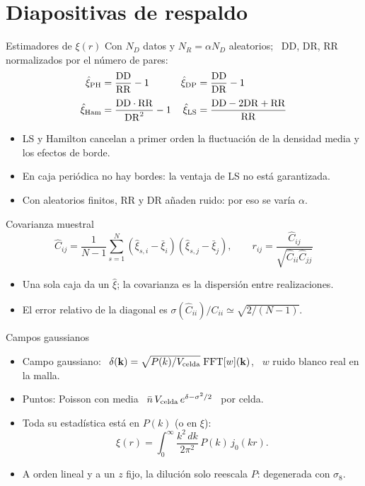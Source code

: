 \documentclass[aspectratio=169]{beamer}
\newcommand{\DD}{\mathrm{DD}}
\newcommand{\DR}{\mathrm{DR}}
\newcommand{\RR}{\mathrm{RR}}
\begin{document}
\appendix
\section{Diapositivas de respaldo}

\begin{frame}{Estimadores de $\xi(r)$}
  Con $N_D$ datos y $N_R=\alpha N_D$ aleatorios; \ DD, DR, RR normalizados por el número de pares:
  \begin{align*}
    \hat\xi_{\rm PH}  &= \frac{\DD}{\RR}-1 &
    \hat\xi_{\rm DP}  &= \frac{\DD}{\DR}-1\\[0.3em]
    \hat\xi_{\rm Ham} &= \frac{\DD\cdot\RR}{\DR^2}-1 &
    \hat\xi_{\rm LS}  &= \frac{\DD-2\DR+\RR}{\RR}
  \end{align*}
  \begin{itemize}
    \item LS y Hamilton cancelan a primer orden la fluctuación de la densidad media y los efectos de borde.
    \item En caja periódica no hay bordes: la ventaja de LS no está garantizada.
    \item Con aleatorios finitos, $\RR$ y $\DR$ añaden ruido: por eso se varía $\alpha$.
  \end{itemize}
\end{frame}

\begin{frame}{Covarianza muestral}
  \[
    \hat C_{ij} = \frac{1}{N-1}\sum_{s=1}^{N}
    (\hat\xi_{s,i}-\bar\xi_i)(\hat\xi_{s,j}-\bar\xi_j),
    \qquad
    r_{ij} = \frac{\hat C_{ij}}{\sqrt{\hat C_{ii}\hat C_{jj}}}
  \]
  \begin{itemize}
    \setlength\itemsep{0.6em}
    \item Una sola caja da un $\hat\xi$; la covarianza es la dispersión entre realizaciones.
    \item El error relativo de la diagonal es $\sigma(\hat C_{ii})/C_{ii}\simeq\sqrt{2/(N-1)}$.
  \end{itemize}
\end{frame}

\begin{frame}{Campos gaussianos}
  \begin{itemize}
    \setlength\itemsep{0.8em}
    \item Campo gaussiano: \
      $\delta(\mathbf k) = \sqrt{P(k)/V_{\rm celda}}\;\mathrm{FFT}[w](\mathbf k)$, \ $w$ ruido blanco real en la malla.
    \item Puntos: Poisson con media \ $\bar n\,V_{\rm celda}\,e^{\delta-\sigma^2/2}$ \ por celda.
    \item Toda su estadística está en $P(k)$ (o en $\xi$):
      \[
        \xi(r) = \int_0^\infty \frac{k^2\,dk}{2\pi^2}\,P(k)\,j_0(kr).
      \]
    \item A orden lineal y a un $z$ fijo, la dilución solo reescala $P$: degenerada con $\sigma_8$.
  \end{itemize}
\end{frame}
\end{document}
